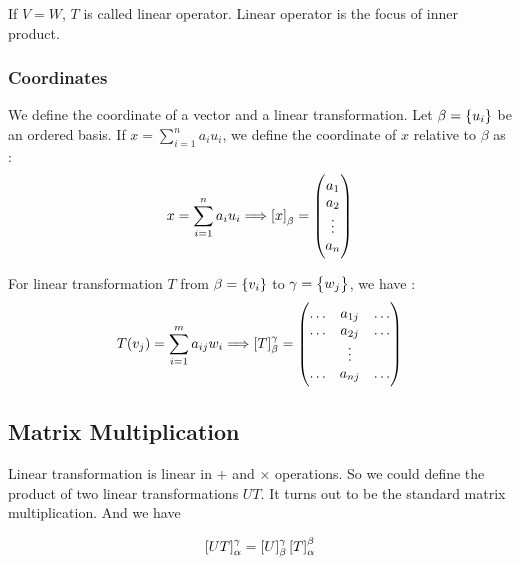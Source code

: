 If $V = W$, $T$ is called linear operator. Linear operator is the focus of inner product.



\subsubsection{Coordinates}

We define the coordinate of a vector and a linear transformation. Let $\beta = \set{u_i}$ be an ordered basis. If $x = \sum_{i=1}^n a_i u_i$, we define the coordinate of $x$ relative to $\beta$ as :
\begin{equation}
    x = \sum_{i=1}^n a_i u_i \Longrightarrow \coordinate{x}_\beta = \begin{pmatrix}
        a_1 \\
        a_2 \\
        \vdots \\
        a_n
    \end{pmatrix}
\end{equation}

For linear transformation $T$ from $\beta = \set{v_i} $ to $\gamma = \set{w_j}$, we have :
\begin{equation}
    T(v_j) = \sum_{i=1}^m a_{ij} w_i \Longrightarrow \coordinate{T}_{\beta}^{\gamma} = \begin{pmatrix}
        \hdots & a_{1j} & \hdots \\
        \hdots & a_{2j} & \hdots \\
        & \vdots \\
        \hdots & a_{nj} & \hdots \\
    \end{pmatrix}
\end{equation}



\subsection{Matrix Multiplication}

Linear transformation is linear in $+$ and $\times$ operations. So we could define the product of two linear transformations $UT$. It turns out to be the standard matrix multiplication. And we have

\begin{equation}\label{matrix_coordinate}
    \coordinate{UT}_{\alpha}^{\gamma} = \coordinate{U}_{\beta}^{\gamma} \coordinate{T}_{\alpha}^{\beta}
\end{equation}

